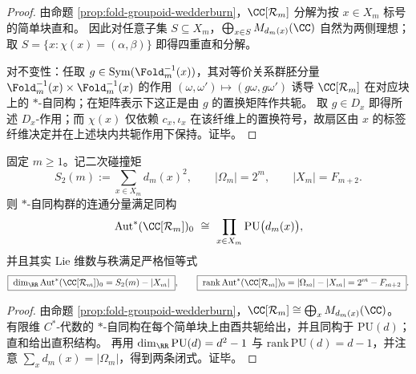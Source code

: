 \begin{proof}
由命题 \ref{prop:fold-groupoid-wedderburn}，\(\CC[\mathcal{R}_m]\) 分解为按 \(x\in X_m\) 标号的简单块直和。
因此对任意子集 \(S\subseteq X_m\)，\(\bigoplus_{x\in S}M_{d_m(x)}(\CC)\) 自然为两侧理想；取 \(S=\{x:\chi(x)=(\alpha,\beta)\}\) 即得四重直和分解。
\par
对不变性：任取 \(g\in \mathrm{Sym}(\Fold_m^{-1}(x))\)，其对等价关系群胚分量 \(\Fold_m^{-1}(x)\times\Fold_m^{-1}(x)\) 的作用
\((\omega,\omega')\mapsto(g\omega,g\omega')\)
诱导 \(\CC[\mathcal{R}_m]\) 在对应块上的 \(\ast\)-自同构；在矩阵表示下这正是由 \(g\) 的置换矩阵作共轭。
取 \(g\in D_x\) 即得所述 \(D_x\)-作用；而 \(\chi(x)\) 仅依赖 \(c_x,\iota_x\) 在该纤维上的置换符号，故扇区由 \(x\) 的标签纤维决定并在上述块内共轭作用下保持。证毕。
\end{proof}





\begin{theorem}\label{thm:fold-collision2-aut-lie-dimension-rank}
固定 \(m\ge 1\)。记二次碰撞矩
\[
S_2(m):=\sum_{x\in X_m} d_m(x)^2,
\qquad
|\Omega_m|=2^m,
\qquad
|X_m|=F_{m+2}.
\]
则 \(\ast\)-自同构群的连通分量满足同构
\[
\mathrm{Aut}^{\ast}(\CC[\mathcal{R}_m])_0\ \cong\ \prod_{x\in X_m}\mathrm{PU}\bigl(d_m(x)\bigr),
\]
并且其实 Lie 维数与秩满足严格恒等式
\[
\boxed{\;
\dim_{\RR}\mathrm{Aut}^{\ast}(\CC[\mathcal{R}_m])_0
=S_2(m)-|X_m|\;},
\qquad
\boxed{\;
\mathrm{rank}\,\mathrm{Aut}^{\ast}(\CC[\mathcal{R}_m])_0
=|\Omega_m|-|X_m|
=2^m-F_{m+2}\; }.
\]
\end{theorem}
\begin{proof}
由命题 \ref{prop:fold-groupoid-wedderburn}，\(\CC[\mathcal{R}_m]\cong\bigoplus_{x}M_{d_m(x)}(\CC)\)。
有限维 \(C^\ast\)-代数的 \(\ast\)-自同构在每个简单块上由酉共轭给出，并且同构于 \(\mathrm{PU}(d)\)；直和给出直积结构。
再用 \(\dim_{\RR}\mathrm{PU}(d)=d^2-1\) 与 \(\mathrm{rank}\,\mathrm{PU}(d)=d-1\)，并注意 \(\sum_x d_m(x)=|\Omega_m|\)，得到两条闭式。证毕。
\end{proof}


